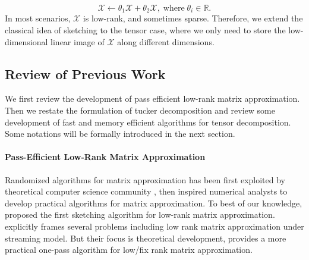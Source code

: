 \begin{equation}
    \mathscr{X} \leftarrow \theta_1\mathscr{X} + \theta_2\mathscr{X}, \; \text{where} \; \theta_i \in \mathbb{R}. 
\end{equation}
In most scenarios, $\mathscr{X}$ is low-rank, and sometimes sparse. Therefore, we extend the classical idea of sketching to the tensor case, where we only need to store the low-dimensional linear image of $\mathscr{X}$ along different dimensions.

\subsection{Review of Previous Work}
We first review the development of pass efficient low-rank matrix approximation. Then we restate the formulation of tucker decomposition and review some development of fast and memory efficient algorithms for tensor decomposition. Some notations will be formally introduced in the next section. 


\paragraph{Pass-Efficient Low-Rank Matrix Approximation} Randomized algorithms for matrix approximation has been first exploited by theoretical computer science community \citep{frieze2004fast, papadimitriou2000latent}, then inspired numerical analysts to develop practical algorithms for matrix approximation. To best of our knowledge, \cite{woolfe2008fast} proposed the first sketching algorithm for low-rank matrix approximation. \cite{clarkson2009numerical} explicitly frames several problems including low rank matrix approximation under streaming model. But their focus is theoretical development, 
\cite{tropp2017practical} provides a more practical one-pass algorithm for low/fix rank matrix approximation. 

